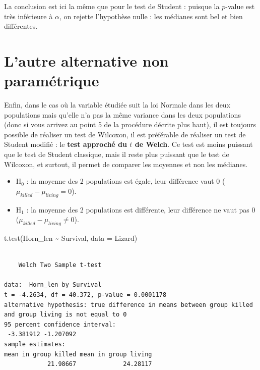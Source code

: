 \documentclass[
  french,
  a4paper,
  DIV=11,
  numbers=noendperiod,
  oneside]{scrreprt}
\newenvironment{Shaded}{}{}
\newcommand{\AttributeTok}[1]{\textcolor[rgb]{0.84,0.23,0.29}{#1}}
\newcommand{\FunctionTok}[1]{\textcolor[rgb]{0.44,0.26,0.76}{#1}}
\newcommand{\NormalTok}[1]{\textcolor[rgb]{0.14,0.16,0.18}{#1}}
\newcommand{\SpecialCharTok}[1]{\textcolor[rgb]{0.00,0.36,0.77}{#1}}
\providecommand{\tightlist}{%
  \setlength{\itemsep}{0pt}\setlength{\parskip}{0pt}}
\begin{document}
La conclusion est ici la même que pour le test de Student : puisque la
\(p\)-value est très inférieure à \(\alpha\), on rejette l'hypothèse
nulle : les médianes sont bel et bien différentes.

\section{L'autre alternative non
paramétrique}\label{lautre-alternative-non-paramuxe9trique}

Enfin, dans le cas où la variable étudiée suit la loi Normale dans les
deux populations mais qu'elle n'a pas la même variance dans les deux
populations (donc si vous arrivez au point 5 de la procédure décrite
plus haut), il est toujours possible de réaliser un test de Wilcoxon, il
est préférable de réaliser un test de Student modifié : le \textbf{test
approché du \(t\) de Welch}. Ce test est moins puissant que le test de
Student classique, mais il reste plus puissant que le test de Wilcoxon,
et surtout, il permet de comparer les moyennes et non les médianes.

\begin{itemize}
\tightlist
\item
  H\(_0\) : la moyenne des 2 populations est égale, leur différence vaut
  0 (\(\mu_{killed}-\mu_{living} = 0\)).
\item
  H\(_1\) : la moyenne des 2 populations est différente, leur différence
  ne vaut pas 0 (\(\mu_{killed}-\mu_{living} \neq 0\)).
\end{itemize}

\begin{Shaded}
\begin{Highlighting}[]
\FunctionTok{t.test}\NormalTok{(Horn\_len }\SpecialCharTok{\textasciitilde{}}\NormalTok{ Survival, }\AttributeTok{data =}\NormalTok{ Lizard)}
\end{Highlighting}
\end{Shaded}

\begin{verbatim}

    Welch Two Sample t-test

data:  Horn_len by Survival
t = -4.2634, df = 40.372, p-value = 0.0001178
alternative hypothesis: true difference in means between group killed and group living is not equal to 0
95 percent confidence interval:
 -3.381912 -1.207092
sample estimates:
mean in group killed mean in group living 
            21.98667             24.28117 
\end{verbatim}
\end{document}
